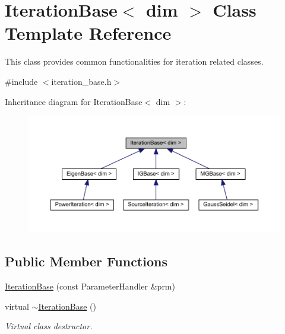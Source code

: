 \hypertarget{class_iteration_base}{}\section{Iteration\+Base$<$ dim $>$ Class Template Reference}
\label{class_iteration_base}


This class provides common functionalities for iteration related classes.  




{\ttfamily \#include $<$iteration\+\_\+base.\+h$>$}



Inheritance diagram for Iteration\+Base$<$ dim $>$\+:\nopagebreak
\begin{figure}[H]
\begin{center}
\leavevmode
\includegraphics[width=350pt]{class_iteration_base__inherit__graph}
\end{center}
\end{figure}
\subsection*{Public Member Functions}
\begin{DoxyCompactItemize}
\item 
\hyperlink{class_iteration_base_a385009434fcdf512953f317088e09b0b}{Iteration\+Base} (const Parameter\+Handler \&prm)
\item 
virtual \hyperlink{class_iteration_base_a942860f3a03d46da883c1c6c430bea55}{$\sim$\+Iteration\+Base} ()
\begin{DoxyCompactList}\small\item\em Virtual class destructor. \end{DoxyCompactList}\end{DoxyCompactItemize}
